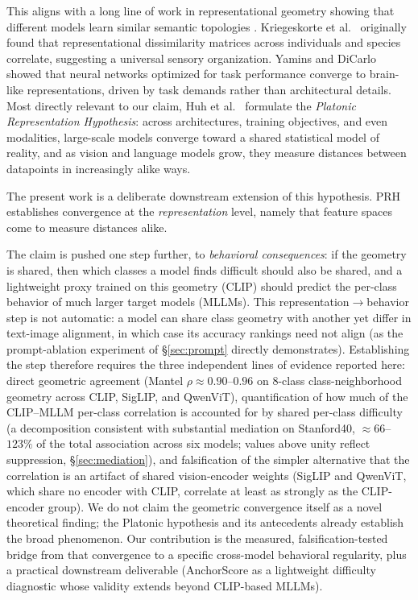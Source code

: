 \documentclass[a4paper,fleqn]{cas-sc}
\begin{document}
 This aligns with a long line of work in representational geometry showing that different models learn similar semantic topologies \cite{kriegeskorte2008representational, mehrer2020individual}. Kriegeskorte et al.~\cite{kriegeskorte2008representational} originally found that representational dissimilarity matrices across individuals and species correlate, suggesting a universal sensory organization. Yamins and DiCarlo~\cite{yamins2016using} showed that neural networks optimized for task performance converge to brain-like representations, driven by task demands rather than architectural details. Most directly relevant to our claim, Huh et al.~\cite{huh2024platonic} formulate the \emph{Platonic Representation Hypothesis}: across architectures, training objectives, and even modalities, large-scale models converge toward a shared statistical model of reality, and as vision and language models grow, they measure distances between datapoints in increasingly alike ways.

 The present work is a deliberate downstream extension of this hypothesis. PRH establishes convergence at the \emph{representation} level, namely that feature spaces come to measure distances alike.

 The claim is pushed one step further, to \emph{behavioral consequences}: if the geometry is shared, then which classes a model finds difficult should also be shared, and a lightweight proxy trained on this geometry (CLIP) should predict the per-class behavior of much larger target models (MLLMs). This representation$\rightarrow$behavior step is not automatic: a model can share class geometry with another yet differ in text-image alignment, in which case its accuracy rankings need not align (as the prompt-ablation experiment of \S\ref{sec:prompt} directly demonstrates). Establishing the step therefore requires the three independent lines of evidence reported here: direct geometric agreement (Mantel $\rho\approx0.90$--$0.96$ on 8-class class-neighborhood geometry across CLIP, SigLIP, and QwenViT), quantification of how much of the CLIP--MLLM per-class correlation is accounted for by shared per-class difficulty (a decomposition consistent with substantial mediation on Stanford40, $\approx 66$--$123\%$ of the total association across six models; values above unity reflect suppression, \S\ref{sec:mediation}), and falsification of the simpler alternative that the correlation is an artifact of shared vision-encoder weights (SigLIP and QwenViT, which share no encoder with CLIP, correlate at least as strongly as the CLIP-encoder group). We do not claim the geometric convergence itself as a novel theoretical finding; the Platonic hypothesis and its antecedents already establish the broad phenomenon. Our contribution is the measured, falsification-tested bridge from that convergence to a specific cross-model behavioral regularity, plus a practical downstream deliverable (AnchorScore as a lightweight difficulty diagnostic whose validity extends beyond CLIP-based MLLMs).
\end{document}
